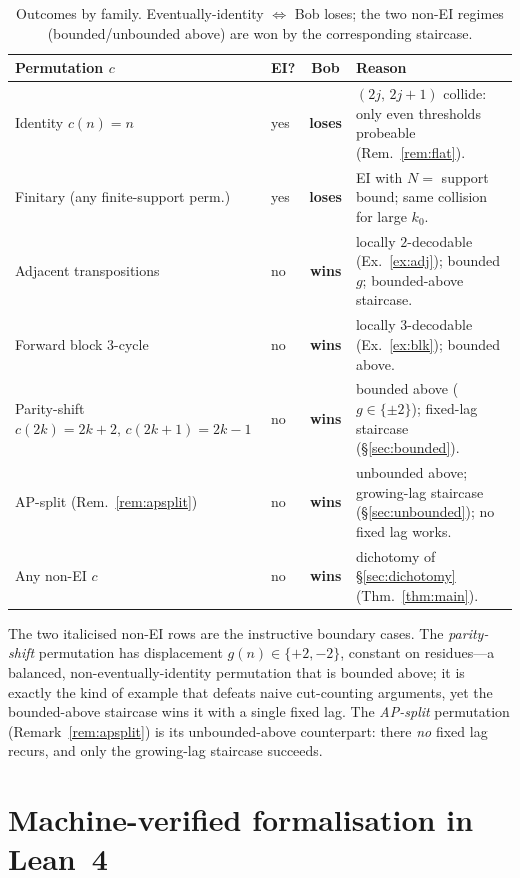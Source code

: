 \documentclass{article}
\begin{document}
\begin{table}[h]
\centering
\renewcommand{\arraystretch}{1.25}
\begin{tabularx}{\textwidth}{@{}l l c X@{}}
\toprule
\textbf{Permutation $c$} & \textbf{EI?} & \textbf{Bob} & \textbf{Reason} \\
\midrule
Identity $c(n)=n$
  & yes & \textbf{loses}
  & $(2j,\,2j{+}1)$ collide: only even thresholds probeable
    (Rem.~\ref{rem:flat}). \\
Finitary (any finite-support perm.)
  & yes & \textbf{loses}
  & EI with $N=$ support bound; same collision for large $k_0$. \\
Adjacent transpositions
  & no & \textbf{wins}
  & locally $2$-decodable (Ex.~\ref{ex:adj}); bounded $g$;
    bounded-above staircase. \\
Forward block $3$-cycle
  & no & \textbf{wins}
  & locally $3$-decodable (Ex.~\ref{ex:blk}); bounded above. \\
Parity-shift $c(2k){=}2k{+}2,\,c(2k{+}1){=}2k{-}1$
  & no & \textbf{wins}
  & bounded above ($g\in\{\pm2\}$); fixed-lag staircase
    (\S\ref{sec:bounded}). \\
AP-split (Rem.~\ref{rem:apsplit})
  & no & \textbf{wins}
  & unbounded above; growing-lag staircase (\S\ref{sec:unbounded});
    no fixed lag works. \\
Any non-EI $c$
  & no & \textbf{wins}
  & dichotomy of \S\ref{sec:dichotomy} (Thm.~\ref{thm:main}). \\
\bottomrule
\end{tabularx}
\caption{Outcomes by family. Eventually-identity $\iff$ Bob loses; the
two non-EI regimes (bounded/unbounded above) are won by the
corresponding staircase.}
\end{table}

The two italicised non-EI rows are the instructive boundary cases. The
\emph{parity-shift} permutation has displacement $g(n)\in\{+2,-2\}$,
constant on residues---a balanced, non-eventually-identity permutation
that is bounded above; it is exactly the kind of example that defeats
naive cut-counting arguments, yet the bounded-above staircase wins it
with a single fixed lag. The \emph{AP-split} permutation
(Remark~\ref{rem:apsplit}) is its unbounded-above counterpart: there
\emph{no} fixed lag recurs, and only the growing-lag staircase succeeds.

\section{Machine-verified formalisation in Lean~4}
\label{sec:lean}
\end{document}

